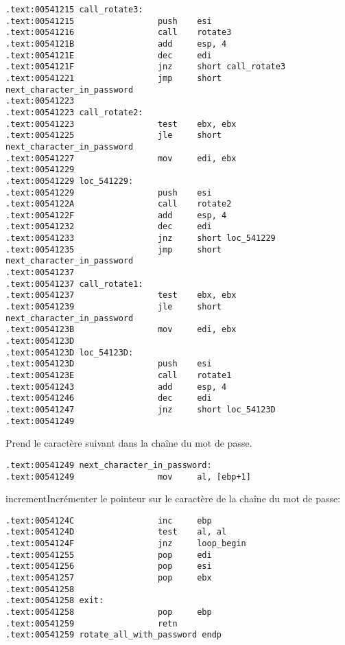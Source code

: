 \begin{lstlisting}[style=customasmx86]
.text:00541215 call_rotate3:
.text:00541215                 push    esi
.text:00541216                 call    rotate3
.text:0054121B                 add     esp, 4
.text:0054121E                 dec     edi
.text:0054121F                 jnz     short call_rotate3
.text:00541221                 jmp     short next_character_in_password
.text:00541223
.text:00541223 call_rotate2:
.text:00541223                 test    ebx, ebx
.text:00541225                 jle     short next_character_in_password
.text:00541227                 mov     edi, ebx
.text:00541229
.text:00541229 loc_541229:
.text:00541229                 push    esi
.text:0054122A                 call    rotate2
.text:0054122F                 add     esp, 4
.text:00541232                 dec     edi
.text:00541233                 jnz     short loc_541229
.text:00541235                 jmp     short next_character_in_password
.text:00541237
.text:00541237 call_rotate1:
.text:00541237                 test    ebx, ebx
.text:00541239                 jle     short next_character_in_password
.text:0054123B                 mov     edi, ebx
.text:0054123D
.text:0054123D loc_54123D:
.text:0054123D                 push    esi
.text:0054123E                 call    rotate1
.text:00541243                 add     esp, 4
.text:00541246                 dec     edi
.text:00541247                 jnz     short loc_54123D
.text:00541249
\end{lstlisting}

Prend le caractère suivant dans la chaîne du mot de passe.

\begin{lstlisting}[style=customasmx86]
.text:00541249 next_character_in_password:
.text:00541249                 mov     al, [ebp+1]
\end{lstlisting}

\gls{increment}{Incrémenter} le pointeur sur le caractère de la chaîne du mot de
passe:

\begin{lstlisting}[style=customasmx86]
.text:0054124C                 inc     ebp
.text:0054124D                 test    al, al
.text:0054124F                 jnz     loop_begin
.text:00541255                 pop     edi
.text:00541256                 pop     esi
.text:00541257                 pop     ebx
.text:00541258
.text:00541258 exit:
.text:00541258                 pop     ebp
.text:00541259                 retn
.text:00541259 rotate_all_with_password endp
\end{lstlisting}

